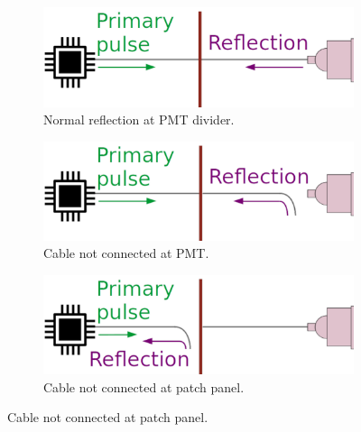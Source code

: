 \begin{figure}
     \centering
     \begin{subfigure}[b]{0.3\textwidth}
         \centering
         \includegraphics[width=1.1\textwidth]{commissioning/fig_commissioning/scheme_reflecto.pdf}
         \captionsetup{justification=centering}
         \caption{Normal reflection at PMT divider.
         \label{subfig:reflecto_normal}}

     \end{subfigure}
     \hfill
     \begin{subfigure}[b]{0.3\textwidth}
         \centering
         \includegraphics[width=1.1\textwidth]{commissioning/fig_commissioning/scheme_reflecto_1.pdf}
         \captionsetup{justification=centering}
         \caption{Cable not connected at PMT.
         \label{subfig:reflecto_pmt}}

     \end{subfigure}
     \hfill
     \begin{subfigure}[b]{0.3\textwidth}
         \centering
         \includegraphics[width=1.1\textwidth]{commissioning/fig_commissioning/scheme_reflecto_2.pdf}
         \captionsetup{justification=centering}
         \caption{Cable not connected at patch panel.
         \label{subfig:reflecto_pp}}


\end{subfigure}
\end{figure}
